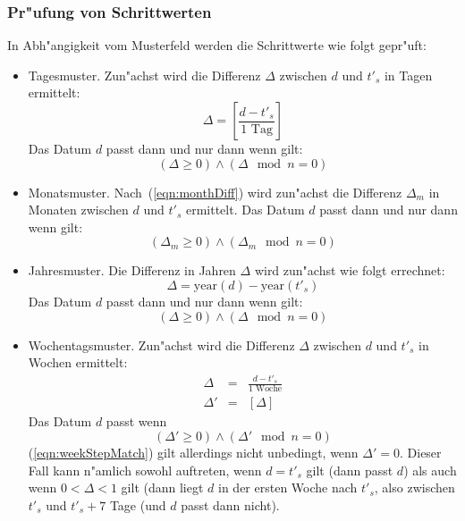 \documentclass[a4paper]{article}
\newcommand*{\yearf}{\mathrm{year}}
\numberwithin{equation}{section}
\begin{document}
\subsubsection{Pr"ufung von Schrittwerten}
In Abh"angigkeit vom Musterfeld werden die Schrittwerte wie folgt gepr"uft:
\begin{itemize}
\item Tagesmuster. Zun"achst wird die Differenz $\Delta$ zwischen $d$ und $t'_s$
  in Tagen ermittelt:
  \begin{equation}
    \Delta = \left[\frac{d - t'_s}{1 \textrm{ Tag}}\right]
  \end{equation}
  Das Datum $d$ passt dann und nur dann wenn gilt:
  \begin{equation}(\Delta \ge 0) \wedge (\Delta \mod n = 0)\end{equation}
\item Monatsmuster. Nach~(\ref{eqn:monthDiff}) wird zun"achst die Differenz
  $\Delta_m$ in Monaten zwischen $d$ und $t'_s$ ermittelt. Das Datum $d$ passt
  dann und nur dann wenn gilt:
  \begin{equation}(\Delta_m \ge 0) \wedge (\Delta_m \mod n = 0)\end{equation}
\item Jahresmuster. Die Differenz in Jahren $\Delta$ wird zun"achst wie folgt
  errechnet:
  \begin{equation}\Delta = \yearf(d) - \yearf(t'_s)\end{equation}
  Das Datum $d$ passt dann und nur dann wenn gilt:
  \begin{equation}(\Delta \ge 0) \wedge (\Delta \mod n = 0)\end{equation}
\item Wochentagsmuster. Zun"achst wird die Differenz $\Delta$ zwischen $d$ und
  $t'_s$ in Wochen ermittelt:
  \begin{eqnarray}
    \Delta & = & \frac{d - t'_s}{1 \textrm{ Woche}} \\
    \Delta' & = & \left[\Delta\right]
  \end{eqnarray}
  Das Datum $d$ passt wenn
  \begin{equation}\label{eqn:weekStepMatch}
    (\Delta' \ge 0) \wedge (\Delta' \mod n = 0)
  \end{equation}
  (\ref{eqn:weekStepMatch}) gilt allerdings nicht unbedingt, wenn $\Delta' = 0$.
  Dieser Fall kann n"amlich sowohl auftreten, wenn $d = t'_s$ gilt (dann passt
  $d$) als auch wenn $0 < \Delta < 1$ gilt (dann liegt $d$ in der ersten Woche
  nach $t'_s$, also zwischen $t'_s$ und $t'_s + 7$ Tage (und $d$ passt dann
  nicht).
\end{itemize}
\end{document}
